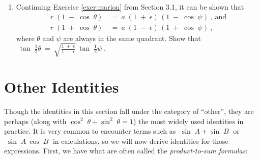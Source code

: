 {\begin{enumerate}[\bfseries 1.]
\begin{multicols}{2}
\end{multicols}
 \item Continuing Exercise \ref{exer:marion} from Section 3.1, it can be shown that
  \begin{align*}
   r\;(1 \;-\; \cos\;\theta) ~&=~ a\;(1 \;+\; \epsilon)\,(1 \;-\; \cos\;\psi) ~,~\text{and}\\
   r\;(1 \;+\; \cos\;\theta) ~&=~ a\;(1 \;-\; \epsilon)\,(1 \;+\; \cos\;\psi) ~,
  \end{align*}
  where $\theta$ and $\psi$ are always in the same quadrant. Show that
  $\;\tan\;\tfrac{1}{2}\theta ~=~ \sqrt{\frac{1 \;+\; \epsilon}{1 \;-\; \epsilon}}~
  \tan\;\tfrac{1}{2}\psi\;$.
\end{enumerate}}

\newpage
\section{Other Identities}
Though the identities in this section fall under the category of ``other'', they are perhaps
(along with $\cos^2 \;\theta + \sin^2 \;\theta = 1$) the most widely used identities in practice.
It is very common to encounter terms such as $\;\sin\;A + \sin\;B\;$ or $\;\sin\;A~\cos\;B\;$ in
calculations, so we will now derive identities for those expressions. First, we have what are often
called the \emph{product-to-sum formulas}:

\begin{center}\end{center}

